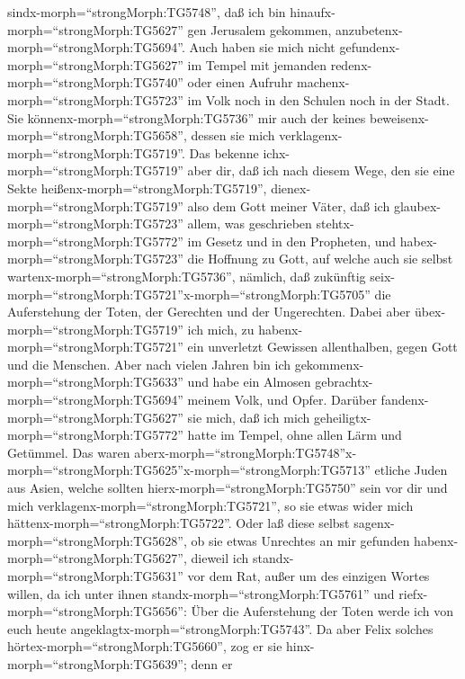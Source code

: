 sindx-morph=``strongMorph:TG5748'', daß ich bin
hinaufx-morph=``strongMorph:TG5627'' gen Jerusalem gekommen,
anzubetenx-morph=``strongMorph:TG5694''.  Auch haben sie
mich nicht gefundenx-morph=``strongMorph:TG5627'' im Tempel mit jemanden
redenx-morph=``strongMorph:TG5740'' oder einen Aufruhr
machenx-morph=``strongMorph:TG5723'' im Volk noch in den Schulen noch in
der Stadt.  Sie könnenx-morph=``strongMorph:TG5736'' mir
auch der keines beweisenx-morph=``strongMorph:TG5658'', dessen sie mich
verklagenx-morph=``strongMorph:TG5719''.  Das bekenne
ichx-morph=``strongMorph:TG5719'' aber dir, daß ich nach diesem Wege,
den sie eine Sekte heißenx-morph=``strongMorph:TG5719'',
dienex-morph=``strongMorph:TG5719'' also dem Gott meiner Väter, daß ich
glaubex-morph=``strongMorph:TG5723'' allem, was geschrieben
stehtx-morph=``strongMorph:TG5772'' im Gesetz und in den Propheten,
 und habex-morph=``strongMorph:TG5723'' die Hoffnung zu
Gott, auf welche auch sie selbst wartenx-morph=``strongMorph:TG5736'',
nämlich, daß zukünftig
seix-morph=``strongMorph:TG5721''x-morph=``strongMorph:TG5705'' die
Auferstehung der Toten, der Gerechten und der Ungerechten. 
Dabei aber übex-morph=``strongMorph:TG5719'' ich mich, zu
habenx-morph=``strongMorph:TG5721'' ein unverletzt Gewissen
allenthalben, gegen Gott und die Menschen.  Aber nach
vielen Jahren bin ich gekommenx-morph=``strongMorph:TG5633'' und habe
ein Almosen gebrachtx-morph=``strongMorph:TG5694'' meinem Volk, und
Opfer.  Darüber fandenx-morph=``strongMorph:TG5627'' sie
mich, daß ich mich geheiligtx-morph=``strongMorph:TG5772'' hatte im
Tempel, ohne allen Lärm und Getümmel.  Das waren
aberx-morph=``strongMorph:TG5748''\textbar x-morph=``strongMorph:TG5625''x-morph=``strongMorph:TG5713''
etliche Juden aus Asien, welche sollten
hierx-morph=``strongMorph:TG5750'' sein vor dir und mich
verklagenx-morph=``strongMorph:TG5721'', so sie etwas wider mich
hättenx-morph=``strongMorph:TG5722''.  Oder laß diese
selbst sagenx-morph=``strongMorph:TG5628'', ob sie etwas Unrechtes an
mir gefunden habenx-morph=``strongMorph:TG5627'', dieweil ich
standx-morph=``strongMorph:TG5631'' vor dem Rat,  außer um
des einzigen Wortes willen, da ich unter ihnen
standx-morph=``strongMorph:TG5761'' und
riefx-morph=``strongMorph:TG5656'': Über die Auferstehung der Toten
werde ich von euch heute angeklagtx-morph=``strongMorph:TG5743''.
 Da aber Felix solches hörtex-morph=``strongMorph:TG5660'',
zog er sie hinx-morph=``strongMorph:TG5639''; denn er
